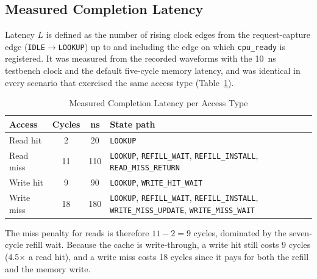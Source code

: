 \documentclass[conference,a4paper]{IEEEtran}
\begin{document}
\subsection{Measured Completion Latency}\label{sec:lat}
Latency $L$ is defined as the number of rising clock edges from the request-capture edge (\texttt{IDLE}$\rightarrow$\texttt{LOOKUP}) up to and including the edge on which \texttt{cpu\_ready} is registered. It was measured from the recorded waveforms with the 10~ns testbench clock and the default five-cycle memory latency, and was identical in every scenario that exercised the same access type (Table~\ref{tab:lat}).

\begin{table}[!t]
\caption{Measured Completion Latency per Access Type}\label{tab:lat}
\centering
\renewcommand{\arraystretch}{1.05}
\footnotesize
\begin{tabular}{@{}lccp{3.1cm}@{}}
\toprule
\textbf{Access} & \textbf{Cycles} & \textbf{ns} & \textbf{State path}\\
\midrule
Read hit & 2 & 20 & \texttt{LOOKUP}\\
Read miss & 11 & 110 & \texttt{LOOKUP}, \texttt{REFILL\_WAIT}, \texttt{REFILL\_INSTALL}, \texttt{READ\_MISS\_RETURN}\\
Write hit & 9 & 90 & \texttt{LOOKUP}, \texttt{WRITE\_HIT\_WAIT}\\
Write miss & 18 & 180 & \texttt{LOOKUP}, \texttt{REFILL\_WAIT}, \texttt{REFILL\_INSTALL}, \texttt{WRITE\_MISS\_UPDATE}, \texttt{WRITE\_MISS\_WAIT}\\
\bottomrule
\end{tabular}
\end{table}

The miss penalty for reads is therefore $11-2=9$ cycles, dominated by the seven-cycle refill wait. Because the cache is write-through, a write hit still costs 9 cycles (4.5$\times$ a read hit), and a write miss costs 18 cycles since it pays for both the refill and the memory write.
\end{document}
